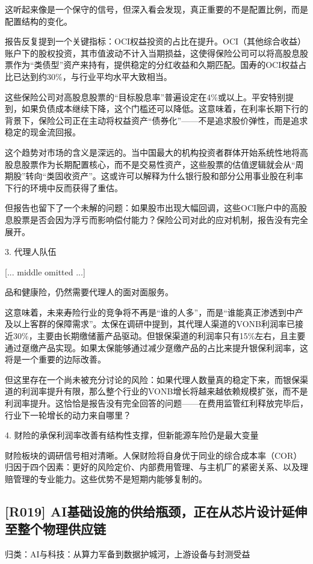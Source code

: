 \documentclass[11pt]{ctexart}
\begin{document}
这听起来像是一个保守的信号，但深入看会发现，真正重要的不是配置比例，而是配置结构的变化。

报告反复提到一个关键指标：OCI权益投资的占比在提升。OCI（其他综合收益）账户下的股权投资，其市值波动不计入当期损益，这使得保险公司可以将高股息股票作为“类债型”资产来持有，提供稳定的分红收益和久期匹配。国寿的OCI权益占比已达到约30\%，与行业平均水平大致相当。

这些保险公司对高股息股票的“目标股息率”普遍设定在4\%或以上。平安特别提到，如果负债成本继续下降，这个门槛还可以降低。这意味着，在利率长期下行的背景下，保险公司正在主动将权益资产“债券化”——不是追求股价弹性，而是追求稳定的现金流回报。

这个趋势对市场的含义是深远的。当中国最大的机构投资者群体开始系统性地将高股息股票作为长期配置核心，而不是交易性资产，这些股票的估值逻辑就会从“周期股”转向“类固收资产”。这或许可以解释为什么银行股和部分公用事业股在利率下行的环境中反而获得了重估。

但报告也留下了一个未解的问题：如果股市出现大幅回调，这些OCI账户中的高股息股票是否会因为浮亏而影响偿付能力？保险公司对此的应对机制，报告没有完全展开。

3. 代理人队伍

[... middle omitted ...]

品和健康险，仍然需要代理人的面对面服务。

这意味着，未来寿险行业的竞争将不再是“谁的人多”，而是“谁能真正渗透到中产及以上客群的保障需求”。太保在调研中提到，其代理人渠道的VONB利润率已接近30\%，主要由长期缴储蓄产品驱动。但银保渠道的利润率只有15\%左右，且主要通过趸缴产品实现。如果太保能够通过减少趸缴产品的占比来提升银保利润率，这将是一个重要的边际改善。

但这里存在一个尚未被充分讨论的风险：如果代理人数量真的稳定下来，而银保渠道的利润率提升有限，那么整个行业的VONB增长将越来越依赖规模扩张，而不是利润率提升。这恰恰是报告没有完全回答的问题——在费用监管红利释放完毕后，行业下一轮增长的动力来自哪里？

4. 财险的承保利润率改善有结构性支撑，但新能源车险仍是最大变量

财险板块的调研信号相对清晰。人保财险将自身优于同业的综合成本率（COR）归因于四个因素：更好的风险定价、内部费用管理、与主机厂的紧密关系、以及理赔管理的专业能力。这些优势不是短期内能够复制的。

\subsection{[R019] AI基础设施的供给瓶颈，正在从芯片设计延伸至整个物理供应链}
{\small\color{refgray}归类：AI与科技：从算力军备到数据护城河，上游设备与封测受益}
\end{document}
